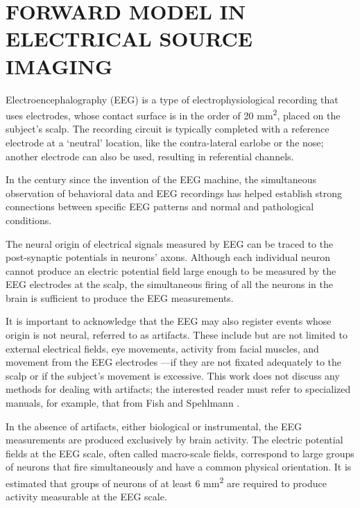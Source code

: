 \chapter{FORWARD MODEL IN ELECTRICAL SOURCE IMAGING}
\label{ch:forward}





Electroencephalography (EEG) is a type of electrophysiological recording that uses electrodes, whose contact surface is in the order of 20 \si{mm^2}, placed on the subject's scalp.
%
The recording circuit is typically completed with a reference electrode at a `neutral' location, like the contra-lateral earlobe or the nose; another electrode can also be used, resulting in referential channels. 
%

In the century since the invention of the EEG machine, the simultaneous observation of behavioral data and EEG recordings has helped establish strong connections between specific EEG patterns and normal and pathological conditions.

The neural origin of electrical signals measured by EEG can be traced to the post-synaptic potentials in neurons' axons.
%
Although each individual neuron cannot produce an electric potential field large enough to be measured by the EEG electrodes at the scalp, the simultaneous firing of all the neurons in the brain is sufficient to produce the EEG measurements.

It is important to acknowledge that the EEG may also register events whose origin is not neural, referred to as artifacts. These include but are not limited to external electrical fields, eye movements, activity from facial muscles, and movement from the EEG electrodes —if they are not fixated adequately to the scalp or if the subject's movement is excessive.
%
This work does not discuss any methods for dealing with artifacts; the interested reader must refer to specialized manuals, for example, that from Fish and Spehlmann \cite{fisch1999fisch}.

In the absence of artifacts, either biological or instrumental, the EEG measurements are produced exclusively by brain activity.
%
The electric potential fields at the EEG scale, often called macro-scale fields, correspond to large groups of neurons that fire simultaneously and have a common physical orientation.
%
It is estimated that groups of neurons of at least 6 \si{mm^2} are required to produce activity measurable at the EEG scale.

